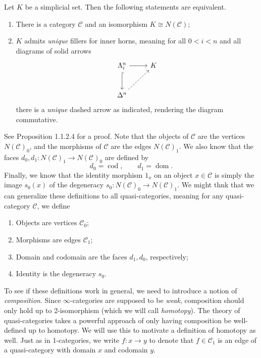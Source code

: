 \begin{proposition}\label{5.2}
	Let $K$ be a simplicial set. Then the following statements are equivalent.
	\begin{enumerate}
		\item There is a category $\mathcal{C} $ and an isomorphism $K\cong N(\mathcal{C} )$;
		\item $K$ admits \emph{unique} fillers for inner horns, meaning for all $0<i<n$ and all diagrams of solid arrows
			\[\begin{tikzcd}[row sep = 2.5em, column sep = 2.5em]
			\Lambda _i^n\ar[r] \ar[hook, d]  & K \\
			\Delta ^n \ar[dashed, ur]  & 
			\end{tikzcd}\]
			there is a \emph{unique} dashed arrow as indicated, rendering the diagram commutative.
	\end{enumerate}
\end{proposition}

See \cite{htt} Proposition 1.1.2.4 for a proof. Note that the objects of $\mathcal{C} $ are the vertices $N(\mathcal{C} )_0$, and the morphisms of $\mathcal{C} $ are the edges $N(\mathcal{C} )_1$. We also know that the faces $d_0,d_1 : N(\mathcal{C} )_1 \to N(\mathcal{C} )_0$ are defined by
\[
	d_0 = \operatorname{cod} ,\qquad d_1=\operatorname{dom} 
.\]
Finally, we know that the identity morphism $1_x$ on an object $x\in \mathcal{C} $ is simply the image $s_0(x)$ of the degeneracy $s_0 : N(\mathcal{C} )_0 \to N(\mathcal{C} )_1$. We might thnk that we can generalize these definitions to all quasi-categories, meaning for any quasi-category $\mathcal{C} $, we define
\begin{enumerate}
	\item Objects are vertices $\mathcal{C} _0$;
	\item Morphisms are edges $\mathcal{C} _1$;
	\item Domain and codomain are the faces $d_1,d_0$, respectively;
	\item Identity is the degeneracy $s_0$.
\end{enumerate}
To see if these definitions work in general, we need to introduce a notion of \emph{composition}. Since $\infty $-categories are supposed to be \emph{weak}, composition should only hold up to 2-isomorphism (which we will call \emph{homotopy}). The theory of quasi-categories takes a powerful approach of only having composition be well-defined up to homotopy. We will use this to motivate a definition of homotopy as well. Just as in 1-categories, we write $f : x \to y$ to denote that $f\in \mathcal{C} _1$ is an edge of a quasi-category with domain $x$ and codomain $y$.

